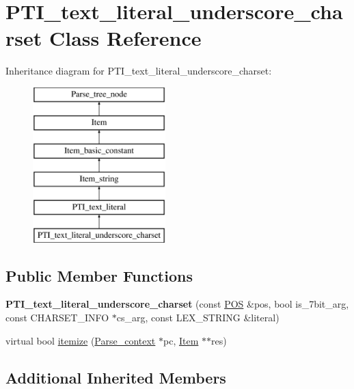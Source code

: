 \hypertarget{classPTI__text__literal__underscore__charset}{}\section{P\+T\+I\+\_\+text\+\_\+literal\+\_\+underscore\+\_\+charset Class Reference}
\label{classPTI__text__literal__underscore__charset}
Inheritance diagram for P\+T\+I\+\_\+text\+\_\+literal\+\_\+underscore\+\_\+charset\+:\begin{figure}[H]
\begin{center}
\leavevmode
\includegraphics[height=6.000000cm]{classPTI__text__literal__underscore__charset}
\end{center}
\end{figure}
\subsection*{Public Member Functions}
\begin{DoxyCompactItemize}
\item 
\mbox{\label{classPTI__text__literal__underscore__charset_a6edee64ec193750d09e3fead0f406a86}} 
{\bfseries P\+T\+I\+\_\+text\+\_\+literal\+\_\+underscore\+\_\+charset} (const \mbox{\hyperlink{structYYLTYPE}{P\+OS}} \&pos, bool is\+\_\+7bit\+\_\+arg, const C\+H\+A\+R\+S\+E\+T\+\_\+\+I\+N\+FO $\ast$cs\+\_\+arg, const L\+E\+X\+\_\+\+S\+T\+R\+I\+NG \&literal)
\item 
virtual bool \mbox{\hyperlink{classPTI__text__literal__underscore__charset_a57202ec54acdca0b35c862a0a79d5a64}{itemize}} (\mbox{\hyperlink{structParse__context}{Parse\+\_\+context}} $\ast$pc, \mbox{\hyperlink{classItem}{Item}} $\ast$$\ast$res)
\end{DoxyCompactItemize}
\subsection*{Additional Inherited Members}


